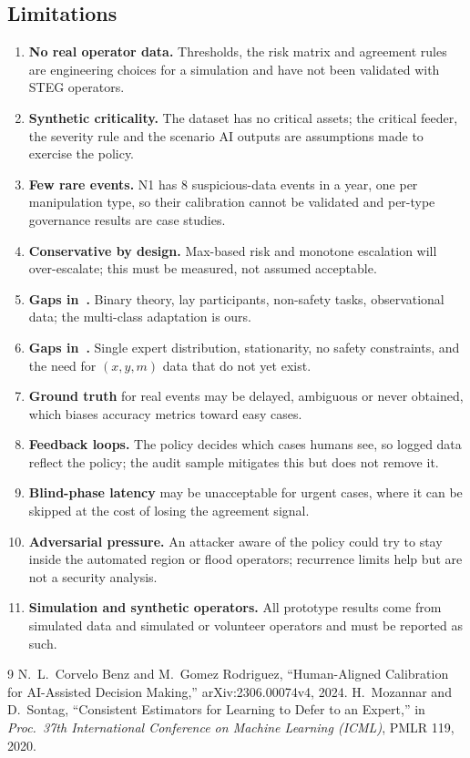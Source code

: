 \documentclass[11pt,a4paper]{article}
\renewcommand{\_}{\textunderscore\allowbreak}
\begin{document}
\subsection{Limitations}
\begin{enumerate}[leftmargin=*,itemsep=1pt]
\item \textbf{No real operator data.} Thresholds, the risk matrix and agreement rules are engineering choices for
a simulation and have not been validated with STEG operators.
\item \textbf{Synthetic criticality.} The dataset has no critical assets; the critical feeder, the severity rule
and the scenario AI outputs are assumptions made to exercise the policy.
\item \textbf{Few rare events.} N1 has 8 suspicious-data events in a year, one per manipulation type, so their
calibration cannot be validated and per-type governance results are case studies.
\item \textbf{Conservative by design.} Max-based risk and monotone escalation will over-escalate; this must be
measured, not assumed acceptable.
\item \textbf{Gaps in~\cite{benz}.} Binary theory, lay participants, non-safety tasks, observational data; the
multi-class adaptation is ours.
\item \textbf{Gaps in~\cite{mozannar}.} Single expert distribution, stationarity, no safety constraints, and the
need for $(x,y,m)$ data that do not yet exist.
\item \textbf{Ground truth} for real events may be delayed, ambiguous or never obtained, which biases accuracy
metrics toward easy cases.
\item \textbf{Feedback loops.} The policy decides which cases humans see, so logged data reflect the policy; the
audit sample mitigates this but does not remove it.
\item \textbf{Blind-phase latency} may be unacceptable for urgent cases, where it can be skipped at the cost of
losing the agreement signal.
\item \textbf{Adversarial pressure.} An attacker aware of the policy could try to stay inside the automated
region or flood operators; recurrence limits help but are not a security analysis.
\item \textbf{Simulation and synthetic operators.} All prototype results come from simulated data and simulated
or volunteer operators and must be reported as such.
\end{enumerate}

\begin{thebibliography}{9}
 N.~L.~Corvelo Benz and M.~Gomez Rodriguez, ``Human-Aligned Calibration for AI-Assisted Decision
Making,'' arXiv:2306.00074v4, 2024.
 H.~Mozannar and D.~Sontag, ``Consistent Estimators for Learning to Defer to an Expert,'' in
\emph{Proc.\ 37th International Conference on Machine Learning (ICML)}, PMLR 119, 2020.
\end{thebibliography}
\end{document}
